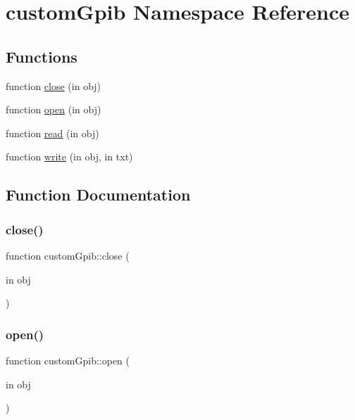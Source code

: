 \hypertarget{namespacecustom_gpib}{}\section{custom\+Gpib Namespace Reference}
\label{namespacecustom_gpib}
\subsection*{Functions}
\begin{DoxyCompactItemize}
\item 
function \hyperlink{namespacecustom_gpib_a897e34f590d0742982a1bb6b42376ac8}{close} (in obj)
\item 
function \hyperlink{namespacecustom_gpib_aba8baa5175afd5cd5be4d954f57598ca}{open} (in obj)
\item 
function \hyperlink{namespacecustom_gpib_ab72cc8876839f04e1ac99b36743c6904}{read} (in obj)
\item 
function \hyperlink{namespacecustom_gpib_ad3a4ea23e71262a13d8b8b8cdc288993}{write} (in obj, in txt)
\end{DoxyCompactItemize}


\subsection{Function Documentation}
\mbox{\label{namespacecustom_gpib_a897e34f590d0742982a1bb6b42376ac8}} 
\subsubsection{\texorpdfstring{close()}{close()}}
{\footnotesize\ttfamily function custom\+Gpib\+::close (\begin{DoxyParamCaption}\item[{in}]{obj }\end{DoxyParamCaption})}

\mbox{\label{namespacecustom_gpib_aba8baa5175afd5cd5be4d954f57598ca}} 
\subsubsection{\texorpdfstring{open()}{open()}}
{\footnotesize\ttfamily function custom\+Gpib\+::open (\begin{DoxyParamCaption}\item[{in}]{obj }\end{DoxyParamCaption})}

